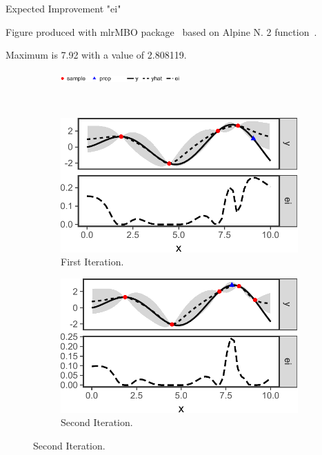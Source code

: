 Expected Improvement "ei"

Figure produced with mlrMBO package~\cite{bischl2017mlrmbo} based on Alpine N. 2
function~\cite{clerc1999swarm}.

Maximum is 7.92 with a value of 2.808119.

\begin{figure}
  \begin{subfigure}{\textwidth}
    \centering
    \includegraphics[width=0.5\textwidth]{figures/bo-legend.pdf}
  \end{subfigure}
  \vspace{0.2em}
  \\
  \centering
  \begin{subfigure}{0.45\textwidth}
    \centering
    \includegraphics[width=\textwidth]{figures/bo1.pdf}
    \caption{First Iteration.}
  \end{subfigure}
  \hspace{1em}
  \begin{subfigure}{0.45\textwidth}
    \centering
    \includegraphics[width=\textwidth]{figures/bo2.pdf}
    \caption{Second Iteration.}
  \end{subfigure}
\end{figure}

